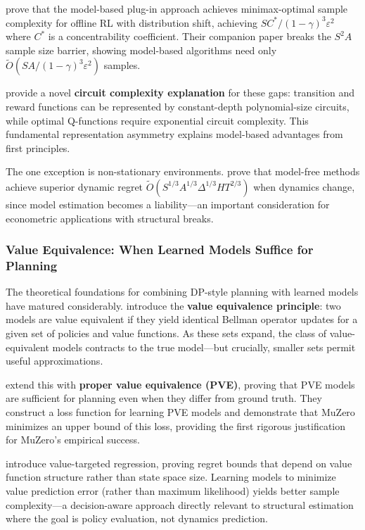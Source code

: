 \citet{li2024offline} prove that the model-based plug-in approach achieves minimax-optimal sample complexity for offline RL with distribution shift, achieving $SC^*/(1-\gamma)^3\varepsilon^2$ where $C^*$ is a concentrability coefficient. Their companion paper \citep{li2024breaking} breaks the $S^2A$ sample size barrier, showing model-based algorithms need only $\tilde{O}(SA/(1-\gamma)^3\varepsilon^2)$ samples.

\citet{zhu2024representation} provide a novel \textbf{circuit complexity explanation} for these gaps: transition and reward functions can be represented by constant-depth polynomial-size circuits, while optimal Q-functions require exponential circuit complexity. This fundamental representation asymmetry explains model-based advantages from first principles.

The one exception is non-stationary environments. \citet{mao2021nonstationary} prove that model-free methods achieve superior dynamic regret $\tilde{O}(S^{1/3}A^{1/3}\Delta^{1/3}HT^{2/3})$ when dynamics change, since model estimation becomes a liability---an important consideration for econometric applications with structural breaks.

\subsubsection{Value Equivalence: When Learned Models Suffice for Planning}

The theoretical foundations for combining DP-style planning with learned models have matured considerably. \citet{grimm2020value} introduce the \textbf{value equivalence principle}: two models are value equivalent if they yield identical Bellman operator updates for a given set of policies and value functions. As these sets expand, the class of value-equivalent models contracts to the true model---but crucially, smaller sets permit useful approximations.

\citet{grimm2021proper} extend this with \textbf{proper value equivalence (PVE)}, proving that PVE models are sufficient for planning even when they differ from ground truth. They construct a loss function for learning PVE models and demonstrate that MuZero minimizes an upper bound of this loss, providing the first rigorous justification for MuZero's empirical success.

\citet{ayoub2020value} introduce value-targeted regression, proving regret bounds that depend on value function structure rather than state space size. Learning models to minimize value prediction error (rather than maximum likelihood) yields better sample complexity---a decision-aware approach directly relevant to structural estimation where the goal is policy evaluation, not dynamics prediction.

